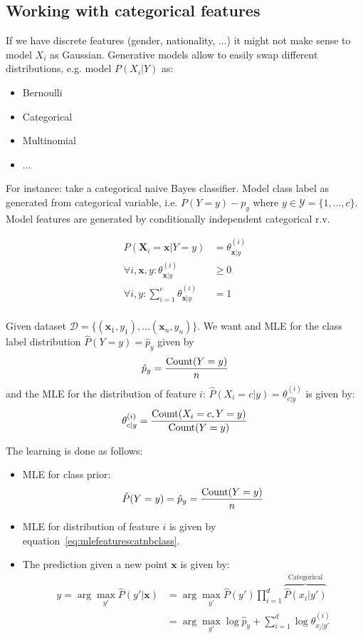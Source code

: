 \documentclass[a4paper,10pt,twoside]{article}
\begin{document}
\subsection{Working with categorical features}

If we have discrete features (gender, nationality, ...) it might not make sense to model $X_i$ as Gaussian. Generative models allow to easily swap different distributions, e.g. model $P(X_i|Y)$ as:
\begin{itemize}
\item Bernoulli
\item Categorical
\item Multinomial
\item ...
\end{itemize}
For instance: take a categorical naive Bayes classifier. Model class label as generated from categorical variable, i.e. $P(Y=y)-p_y$ where $y\in\mathcal{Y}=\{1,\ldots,c\}$. Model features are generated by conditionally independent categorical r.v.

\begin{align*}
  P(\mathbf{X}_i=\mathbf{x}|Y=y) &= \theta_{\mathbf{x}|y}^{(i)}\\
  \forall i,\mathbf{x},y:\theta_{\mathbf{x}|y}^{(i)} &\geq 0\\
  \forall i,y:\sum_{i=1}^{c}\theta_{\mathbf{x}|y}^{(i)} &=1\\
\end{align*}

Given dataset $\mathcal{D}=\{(\mathbf{x}_1,y_1),\ldots(\mathbf{x}_n,y_n)\}$. We want and MLE for the class label distribution $\hat{P}(Y=y)=\hat{p}_y$ given by
\begin{equation*}
  \hat{p}_y={\text{Count}(Y=y)\over n}
\end{equation*}
and the MLE for the distribution of feature $i$: $\hat{P}(X_i=c|y)=\theta_{c|y}^{(i)}$
is given by:
\begin{equation}\label{eq:mlefeaturescatnbclass}
  \theta_{c|y}^{(i)}={\text{Count}(X_i=c,Y=y)\over\text{Count}(Y=y)}
\end{equation}

The learning is done as follows:
\begin{itemize}
\item MLE for class prior:
  \begin{equation*}
    \hat{P}(Y=y) = \hat{p}_y={\text{Count}(Y=y)\over n}
  \end{equation*}
  \item MLE for distribution of feature $i$ is given by equation~\ref{eq:mlefeaturescatnbclass}.
\item The prediction given a new point $\mathbf{x}$ is given by:
  \begin{align*}
    y = \arg\max_{y'}\hat{P}(y'|\mathbf{x})&=\arg\max_{y'}\hat{P}(y')\prod_{i=1}^{d}\overbrace{\hat{P}(x_i|y')}^{\text{Categorical}}\\
    &=\arg\max_{y'}\log\hat{p}_y+\sum_{i=1}^{d}\log\theta_{x_i|y'}^{(i)}
  \end{align*}
\end{itemize}
\end{document}
